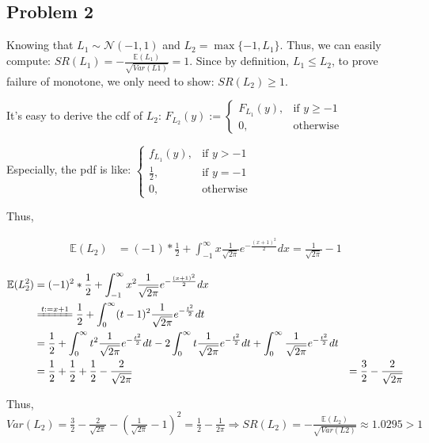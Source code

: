 \documentclass[letterpaper,11pt]{article}
\begin{document}
\begin{spacing}{1.2}
\section*{Problem 2}
Knowing that $L_1 \sim \mathcal{N}(-1,1)$ and $L_2 = \max\{-1,L_1\}$. Thus, we can easily compute: $SR(L_1) = -\frac{\mathbb{E}(L_1)}{\sqrt{Var(L1)}} = 1$. Since by definition, $L_1 \le L_2$, to prove failure of monotone, we only need to show: $SR(L_2) \ge 1$.

It's easy to derive the cdf of $L_2$: $F_{L_2}(y):= 
\begin{cases} F_{L_1}(y), & \mbox{if } y \ge -1 \\
0, & \mbox{otherwise} \end{cases}$

Especially, the pdf is like: $\begin{cases} 
f_{L_1}(y), & \mbox{if } y > -1 \\
\frac{1}{2}, & \mbox{if } y = -1 \\
0, & \mbox{otherwise}
\end{cases}$

Thus,

\begin{equation}
\begin{aligned}
\mathbb{E}(L_2) &= (-1)*\frac{1}{2} + \int_{-1}^{\infty} x \frac{1}{\sqrt{2\pi}} e^{-\frac{(x+1)^2}{2}} dx = \frac{1}{\sqrt{2\pi}} - 1
\end{aligned}
\end{equation}

\begin{equation}
\begin{aligned}
\mathbb{E}(L_2^2) &= (-1)^2*\frac{1}{2} + \int_{-1}^{\infty} x^2 \frac{1}{\sqrt{2\pi}} e^{-\frac{(x+1)^2}{2}} dx\\
&\xlongequal{t:=x+1} \frac{1}{2} + \int_{0}^{\infty} (t-1)^2 \frac{1}{\sqrt{2\pi}} e^{-\frac{t^2}{2}} dt\\
&= \frac{1}{2} + \int_{0}^{\infty} t^2 \frac{1}{\sqrt{2\pi}} e^{-\frac{t^2}{2}} dt - 2\int_{0}^{\infty} t \frac{1}{\sqrt{2\pi}} e^{-\frac{t^2}{2}} dt + \int_{0}^{\infty} \frac{1}{\sqrt{2\pi}} e^{-\frac{t^2}{2}} dt\\
&= \frac{1}{2} + \frac{1}{2} + \frac{1}{2} - \frac{2}{\sqrt{2\pi}}
&= \frac{3}{2} - \frac{2}{\sqrt{2\pi}}
\end{aligned}
\end{equation}

Thus, $Var(L_2) = \frac{3}{2} - \frac{2}{\sqrt{2\pi}} - (\frac{1}{\sqrt{2\pi}} - 1)^2 = \frac{1}{2} - \frac{1}{2\pi} \Rightarrow SR(L_2) = -\frac{\mathbb{E}(L_2)}{\sqrt{Var(L2)}} \approx 1.0295 > 1$ 


\end{spacing}
\end{document}
